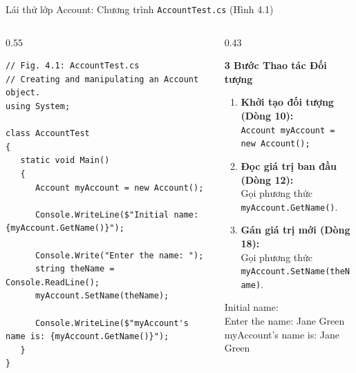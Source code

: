 \documentclass[aspectratio=169, 10pt]{beamer}
\begin{document}
\begin{frame}[fragile]{Lái thử lớp Account: Chương trình \texttt{AccountTest.cs} (Hình 4.1)}
  \begin{columns}[T]
    \begin{column}{0.55\textwidth}
      \begin{tcolorbox}[colback=CodeBg,colframe=UniNavy,title=\textbf{AccountTest.cs (Fig. 4.1)},fonttitle=\small\bfseries]
\begin{lstlisting}
// Fig. 4.1: AccountTest.cs
// Creating and manipulating an Account object.
using System;

class AccountTest
{
   static void Main()
   {
      Account myAccount = new Account();

      Console.WriteLine($"Initial name: {myAccount.GetName()}");

      Console.Write("Enter the name: ");
      string theName = Console.ReadLine();
      myAccount.SetName(theName);

      Console.WriteLine($"myAccount's name is: {myAccount.GetName()}");
   }
}
\end{lstlisting}
      \end{tcolorbox}
    \end{column}

    \begin{column}{0.43\textwidth}
      \begin{exampleblock}{\textbf{3 Bước Thao tác Đối tượng}}
        \begin{enumerate}\small
          \item \textbf{Khởi tạo đối tượng (Dòng 10):}\\
          \texttt{Account myAccount = new Account();}
          \item \textbf{Đọc giá trị ban đầu (Dòng 12):}\\
          Gọi phương thức \texttt{myAccount.GetName()}.
          \item \textbf{Gán giá trị mới (Dòng 18):}\\
          Gọi phương thức \texttt{myAccount.SetName(theName)}.
        \end{enumerate}
      \end{exampleblock}
      \begin{tcolorbox}[colback=UniDark,colframe=UniNavy,title=\textbf{Màn hình Console Output},fonttitle=\small\bfseries]
        \color{white}\ttfamily\scriptsize
        Initial name: \\
        Enter the name: Jane Green\\
        myAccount's name is: Jane Green
      \end{tcolorbox}
    \end{column}
  \end{columns}
\end{frame}
\end{document}
